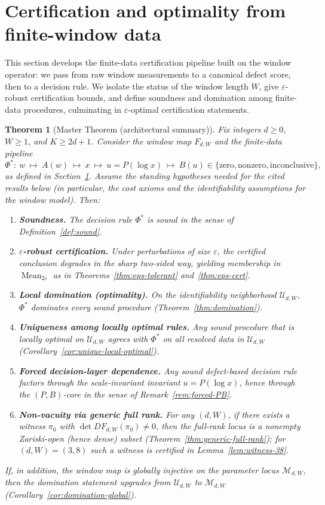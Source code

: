 \documentclass[11pt,reqno]{amsart}
\newtheorem{theorem}{Theorem}[section]
\theoremstyle{definition}
\theoremstyle{remark}
\newcommand{\1}{\mathbf{1}}
\newcommand{\zero}{\mathrm{zero}}
\newcommand{\nonzero}{\mathrm{nonzero}}
\newcommand{\inconclusive}{\mathrm{inconclusive}}
\newcommand{\Mean}{\operatorname{Mean}}
\begin{document}
\section{Certification and optimality from finite-window data}
\label{sec:cert-opt}
This section develops the finite-data certification pipeline built on the window operator:
we pass from raw window measurements to a canonical defect score, then to a decision rule.
We isolate the status of the window length $W$, give $\varepsilon$-robust certification bounds,
and define soundness and domination among finite-data procedures, culminating in
$\varepsilon$-optimal certification statements.



\begin{theorem}[Master Theorem (architectural summary)]\label{thm:master}
Fix integers $d\ge 0$, $W\ge 1$, and $K\ge 2d+1$.  Consider the window map $F_{d,W}$ and the finite-data pipeline
\[
\Phi^\ast:\ w\ \mapsto\ A(w)\ \mapsto\ x\ \mapsto\ u=P(\log x)\ \mapsto\ B(u)\in\{\zero,\nonzero,\inconclusive\},
\]
as defined in Section~\ref{sec:cert-opt}.  Assume the standing hypotheses needed for the cited results below
(in particular, the cost axioms and the identifiability assumptions for the window model).  Then:
\begin{enumerate}[label=\textup{(\roman*)},leftmargin=2.2em]
\item \textbf{Soundness.}  The decision rule $\Phi^\ast$ is sound in the sense of Definition~\ref{def:sound}.
\item \textbf{$\varepsilon$-robust certification.}  Under perturbations of size $\varepsilon$, the certified conclusion degrades in the sharp two-sided way, yielding membership in $\Mean_{2\varepsilon}$ as in Theorems~\ref{thm:eps-tolerant} and~\ref{thm:eps-cert}.
\item \textbf{Local domination (optimality).}  On the identifiability neighborhood $\mathcal U_{d,W}$, $\Phi^\ast$ dominates every sound procedure (Theorem~\ref{thm:domination}).
\item \textbf{Uniqueness among locally optimal rules.}  Any sound procedure that is locally optimal on $\mathcal U_{d,W}$ agrees with $\Phi^\ast$ on all resolved data in $\mathcal U_{d,W}$ (Corollary~\ref{cor:unique-local-optimal}).
\item \textbf{Forced decision-layer dependence.}  Any sound defect-based decision rule factors through the scale-invariant invariant $u=P(\log x)$, hence through the $(P,B)$-core in the sense of Remark~\ref{rem:forced-PB}.
\item \textbf{Non-vacuity via generic full rank.}  For any $(d,W)$, if there exists a witness $\pi_0$ with $\det DF_{d,W}(\pi_0)\neq 0$, then the full-rank locus is a nonempty Zariski-open (hence dense) subset (Theorem~\ref{thm:generic-full-rank}); for $(d,W)=(3,8)$ such a witness is certified in Lemma~\ref{lem:witness-38}.
\end{enumerate}
If, in addition, the window map is globally injective on the parameter locus $\mathcal M_{d,W}$, then the domination statement upgrades from $\mathcal U_{d,W}$ to $\mathcal M_{d,W}$ (Corollary~\ref{cor:domination-global}).
\end{theorem}
\end{document}
